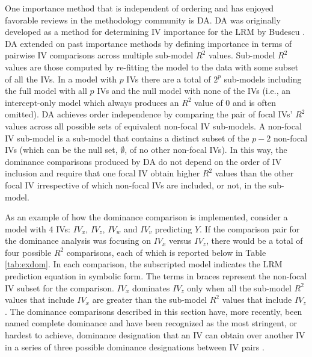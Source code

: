 \documentclass[doc]{apa7}
\begin{document}
	One importance method that is independent of ordering and has enjoyed favorable reviews in the methodology community is DA.
	DA was originally developed as a method for determining IV importance for the LRM by Budescu \parencite*{budescu1993dominance}.
	DA extended on past importance methods by defining importance in terms of pairwise IV comparisons across multiple sub-model $R^2$ values.
	Sub-model $R^2$ values are those computed by re-fitting the model to the data with some subset of all the IVs.
	In a model with $p$ IVs there are a total of $2^p$ sub-models including the full model with all $p$ IVs and the null model with none of the IVs (i.e., an intercept-only model which always produces an $R^2$ value of 0 and is often omitted).
	DA achieves order independence by comparing the pair of focal IVs' $R^2$ values across all possible sets of equivalent non-focal IV sub-models. 
	A non-focal IV sub-model is a sub-model that contains a distinct subset of the $p - 2$ non-focal IVs (which can be the null set, $\emptyset$, of no other non-focal IVs).	
	In this way, the dominance comparisons produced by DA do not depend on the order of IV inclusion and require that one focal IV obtain higher $R^2$ values than the other focal IV irrespective of which non-focal IVs are included, or not, in the sub-model.
	
	As an example of how the dominance comparison is implemented, consider a model with 4 IVs: $IV_x$, $IV_z$, $IV_w$ and $IV_v$ predicting $Y$.
	If the comparison pair for the dominance analysis was focusing on $IV_x$ versus $IV_z$, there would be a total of four possible $R^2$ comparisons, each of which is reported below in Table \ref{tab:exdom}.
	In each comparison, the subscripted model indicates the LRM prediction equation in symbolic form.
	The terms in braces represent the non-focal IV subset for the comparison.
	$IV_x$ dominates $IV_z$ only when all the sub-model $R^2$ values that include $IV_x$ are greater than the sub-model $R^2$ values that include $IV_z$.
	The dominance comparisons described in this section have, more recently, been named complete dominance and have been recognized as the most stringent, or hardest to achieve, dominance designation that an IV can obtain over another IV in a series of three possible dominance designations between IV pairs \parencite{azen2003dominance}.	
\end{document}
